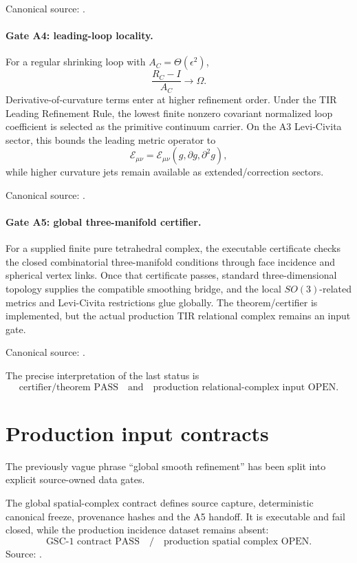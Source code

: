Canonical source:
.

\paragraph{Gate A4: leading-loop locality.}
For a regular shrinking loop with \(A_C=\Theta(\epsilon^2)\),
\[
\frac{R_C-I}{A_C}\longrightarrow\Omega.
\]
Derivative-of-curvature terms enter at higher refinement order.  Under the TIR
Leading Refinement Rule, the lowest finite nonzero covariant normalized loop
coefficient is selected as the primitive continuum carrier.  On the A3
Levi-Civita sector, this bounds the leading metric operator to
\[
\mathcal E_{\mu\nu}
=\mathcal E_{\mu\nu}(g,\partial g,\partial^2g),
\]
while higher curvature jets remain available as extended/correction sectors.

Canonical source:
.

\paragraph{Gate A5: global three-manifold certifier.}
For a supplied finite pure tetrahedral complex, the executable certificate
checks the closed combinatorial three-manifold conditions through face
incidence and spherical vertex links.  Once that certificate passes, standard
three-dimensional topology supplies the compatible smoothing bridge, and the
local \(SO(3)\)-related metrics and Levi-Civita restrictions glue globally.
The theorem/certifier is implemented, but the actual production TIR relational
complex remains an input gate.

Canonical source:
.

The precise interpretation of the last status is
\[
\boxed{
\text{certifier/theorem PASS}
\quad\text{and}\quad
\text{production relational-complex input OPEN}.
}
\]

\section{Production input contracts}

The previously vague phrase ``global smooth refinement'' has been split into
explicit source-owned data gates.

The global spatial-complex contract defines source capture, deterministic
canonical freeze, provenance hashes and the A5 handoff.  It is executable and
fail closed, while the production incidence dataset remains absent:
\[
\boxed{
\text{GSC-1 contract PASS}
\quad/\quad
\text{production spatial complex OPEN}.
}
\]
Source:
.


